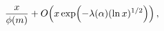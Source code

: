 \[\frac{x}{\mathop{\phi\/}\nolimits\!\left(m\right)}+\mathop{O\/}\nolimits\!%
\left(x\mathop{\exp\/}\nolimits\!\left(-\lambda(\alpha)(\mathop{\ln\/}%
\nolimits x)^{1/2}\right)\right),\]